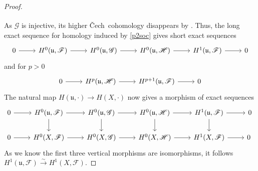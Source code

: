 \documentclass[english,letter,doublesided]{article}
\newcommand{\tosm}{\xrightarrow{\sim}}
\newcommand{\Ff}{\mathscr{F}}
\newcommand{\Hh}{\mathscr{H}}
\newcommand{\Gg}{\mathscr{G}}
\newcommand{\ufr}{\mathfrak{u}}
\theoremstyle{remark}
\theoremstyle{definition}
\newcommand{\cech}{\v Cech~}
\begin{document}
\begin{proof}
\begin{equation}
\begin{tikzcd}
	\end{tikzcd}
	\end{equation}
As $\Gg$ is injective, its higher \cech cohomology disappears by \cite[III.2.4-5]{HSAG}. Thus, the long exact sequence for homology induced by \eqref{p2soc} gives short exact sequences \begin{equation}\begin{tikzcd}0\arrow[r]& H^0(\ufr,\Ff)\arrow[r]&H^0(\ufr,\Gg)\arrow[r]&H^0(\ufr,\Hh)\arrow[r]&H^1(\ufr,\Ff)\arrow[r]&0\end{tikzcd}\end{equation}
and for $p>0$
\begin{equation}\begin{tikzcd}0\arrow[r]&H^p(\ufr,\Hh)\arrow[r]&H^{p+1}(\ufr,\Ff)\arrow[r]&0\end{tikzcd}\end{equation}
The natural map $H(\ufr,\cdot)\to H(X,\cdot)$ now gives a morphism of exact sequences
\begin{equation}\begin{tikzcd}0\arrow[r]& H^0(\ufr,\Ff)\arrow[r]\arrow[d]&H^0(\ufr,\Gg)\arrow[r]\arrow[d]&H^0(\ufr,\Hh)\arrow[r]\arrow[d]&H^1(\ufr,\Ff)\arrow[r]\arrow[d]&0\\
0\arrow[r]& H^0(X,\Ff)\arrow[r]&H^0(X,\Gg)\arrow[r]&H^0(X,\Hh)\arrow[r]&H^1(X,\Ff)\arrow[r]&0\
\end{tikzcd}\end{equation}
As we know the first three vertical morphisms are isomorphisms, it follows $H^1(\ufr,\Ff)\tosm H^1(X,\Ff)$.
\end{proof}
\end{document}
